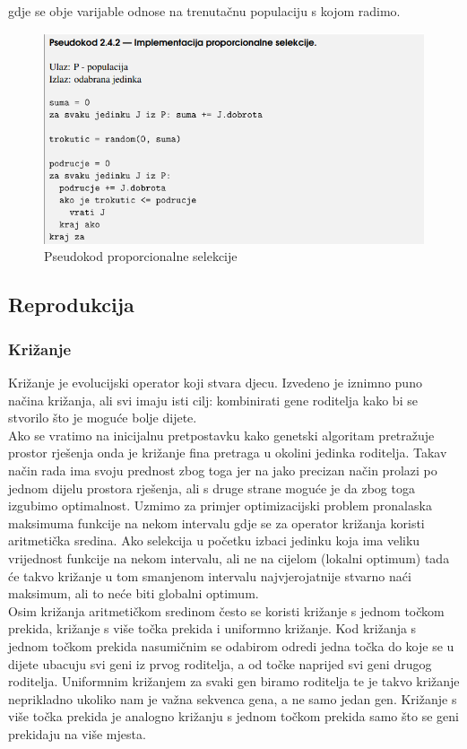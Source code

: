 \documentclass[times, utf8, zavrsni]{fer}
\begin{document}
gdje se obje varijable odnose na trenutačnu populaciju s kojom radimo.

\begin{figure}[!htb]
	\centering
	\includegraphics[width=15cm]{slike/proportionalSel.png}
	\caption{Pseudokod proporcionalne selekcije}
	\label{fig:proportional-selection}
\end{figure}


\subsection{Reprodukcija}

\subsubsection{Križanje}

Križanje je evolucijski operator koji stvara djecu. Izvedeno je iznimno puno načina križanja, ali svi imaju isti cilj: kombinirati gene roditelja kako bi se stvorilo što je moguće bolje dijete. \\Ako se vratimo na inicijalnu pretpostavku kako genetski algoritam pretražuje prostor rješenja onda je križanje fina pretraga u okolini jedinka roditelja. Takav način rada ima svoju prednost zbog toga jer na jako precizan način prolazi po jednom dijelu prostora rješenja, ali s druge strane moguće je da zbog toga izgubimo optimalnost. Uzmimo za primjer optimizacijski problem pronalaska maksimuma funkcije na nekom intervalu gdje se za operator križanja koristi aritmetička sredina. Ako selekcija u početku izbaci jedinku koja ima veliku vrijednost funkcije na nekom intervalu, ali ne na cijelom (lokalni optimum) tada će takvo križanje u tom smanjenom intervalu najvjerojatnije stvarno naći maksimum, ali to neće biti globalni optimum. \\Osim križanja aritmetičkom sredinom često se koristi križanje s jednom točkom prekida, križanje s više točka prekida i uniformno križanje. Kod križanja s jednom točkom prekida nasumičnim se odabirom odredi jedna točka do koje se u dijete ubacuju svi geni iz prvog roditelja, a od točke naprijed svi geni drugog roditelja. Uniformnim križanjem za svaki gen biramo roditelja te je takvo križanje neprikladno ukoliko nam je važna sekvenca gena, a ne samo jedan gen. Križanje s više točka prekida je analogno križanju s jednom točkom prekida samo što se geni prekidaju na više mjesta.
\end{document}
